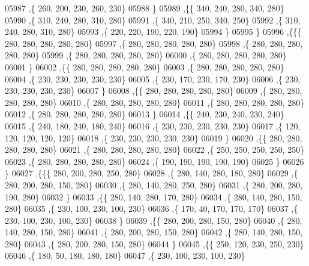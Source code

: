 \begin{DoxyCode}
05987     ,\{   260,   200,   230,   260,   230\}
05988     \}
05989    ,\{\{   340,   240,   280,   340,   280\}
05990     ,\{   310,   240,   280,   310,   280\}
05991     ,\{   340,   210,   250,   340,   250\}
05992     ,\{   310,   240,   280,   310,   280\}
05993     ,\{   220,   220,   190,   220,   190\}
05994     \}
05995    \}
05996   ,\{\{\{   280,   280,   280,   280,   280\}
05997     ,\{   280,   280,   280,   280,   280\}
05998     ,\{   280,   280,   280,   280,   280\}
05999     ,\{   280,   280,   280,   280,   280\}
06000     ,\{   280,   280,   280,   280,   280\}
06001     \}
06002    ,\{\{   280,   280,   280,   280,   280\}
06003     ,\{   280,   280,   280,   280,   280\}
06004     ,\{   230,   230,   230,   230,   230\}
06005     ,\{   230,   170,   230,   170,   230\}
06006     ,\{   230,   230,   230,   230,   230\}
06007     \}
06008    ,\{\{   280,   280,   280,   280,   280\}
06009     ,\{   280,   280,   280,   280,   280\}
06010     ,\{   280,   280,   280,   280,   280\}
06011     ,\{   280,   280,   280,   280,   280\}
06012     ,\{   280,   280,   280,   280,   280\}
06013     \}
06014    ,\{\{   240,   230,   240,   230,   240\}
06015     ,\{   240,   180,   240,   180,   240\}
06016     ,\{   230,   230,   230,   230,   230\}
06017     ,\{   120,   120,   120,   120,   120\}
06018     ,\{   230,   230,   230,   230,   230\}
06019     \}
06020    ,\{\{   280,   280,   280,   280,   280\}
06021     ,\{   280,   280,   280,   280,   280\}
06022     ,\{   250,   250,   250,   250,   250\}
06023     ,\{   280,   280,   280,   280,   280\}
06024     ,\{   190,   190,   190,   190,   190\}
06025     \}
06026    \}
06027   ,\{\{\{   280,   200,   280,   250,   280\}
06028     ,\{   280,   140,   280,   180,   280\}
06029     ,\{   280,   200,   280,   150,   280\}
06030     ,\{   280,   140,   280,   250,   280\}
06031     ,\{   280,   200,   280,   190,   280\}
06032     \}
06033    ,\{\{   280,   140,   280,   170,   280\}
06034     ,\{   280,   140,   280,   150,   280\}
06035     ,\{   230,   100,   230,   100,   230\}
06036     ,\{   170,    40,   170,   170,   170\}
06037     ,\{   230,   100,   230,   100,   230\}
06038     \}
06039    ,\{\{   280,   200,   280,   150,   280\}
06040     ,\{   280,   140,   280,   150,   280\}
06041     ,\{   280,   200,   280,   150,   280\}
06042     ,\{   280,   140,   280,   150,   280\}
06043     ,\{   280,   200,   280,   150,   280\}
06044     \}
06045    ,\{\{   250,   120,   230,   250,   230\}
06046     ,\{   180,    50,   180,   180,   180\}
06047     ,\{   230,   100,   230,   100,   230\}

\end{DoxyCode}
